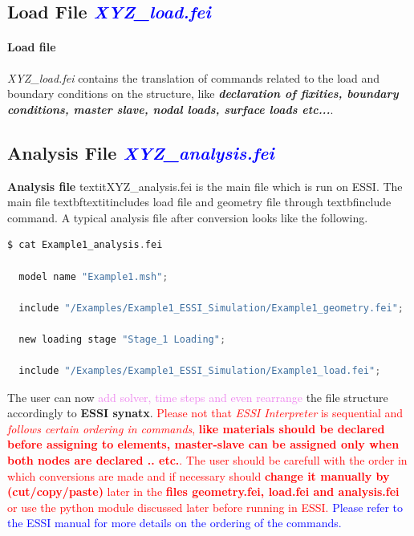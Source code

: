 \documentclass[11pt]{article}
\begin{document}
\subsection{Load File \textcolor{blue}{\textit{XYZ\_load.fei}}}

\paragraph{Load   file}  \textit{XYZ\_load.fei}  contains  the  translation  of
commands  related to the load and boundary conditions on the structure, like
\textbf{\textit{declaration  of fixities, boundary conditions, master slave,
nodal loads, surface loads etc...}}.

\subsection{Analysis File \textcolor{blue}{\textit{XYZ\_analysis.fei}}}

\textbf{Analysis file} textit{XYZ_analysis.fei} is the main file which is run
on ESSI. The main file textbf{textit{includes load file and geometry file}}
through textbf{include command}. A typical analysis file after conversion
looks like the following.

\begin{lstlisting}[language=C]
$ cat Example1_analysis.fei

  model name "Example1.msh";

  include "/Examples/Example1_ESSI_Simulation/Example1_geometry.fei";

  new loading stage "Stage_1 Loading";

  include "/Examples/Example1_ESSI_Simulation/Example1_load.fei";

\end{lstlisting}

The user can now \textcolor{violet}{add solver, time steps and even rearrange}
the file structure accordingly to \textbf{ESSI synatx}.
{\textcolor{red}{Please not that \textit{ESSI Interpreter} is sequential and
\textit{follows certain ordering in commands}, \textbf{like materials should
be declared before assigning to elements, master-slave can be assigned only
when both nodes are declared .. etc.}. The user should be carefull with the
order in which conversions are made and if necessary should \textbf{change it
manually by (cut/copy/paste)} later in the \textbf{files geometry.fei,
load.fei and analysis.fei} or use the python module discussed later before
running in ESSI.}} \textcolor{blue}{{Please refer to the ESSI manual for more
details on the ordering of the commands.}}
\end{document}
